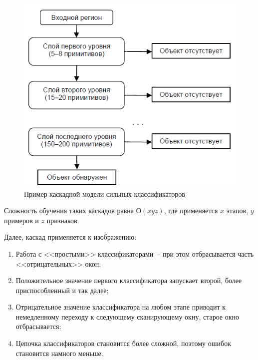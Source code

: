 \begin{figure}
    \centering
    \includegraphics[height=.3\textheight]{145644c4.png}
    \caption{Пример каскадной модели сильных классификаторов}
    \label{fig:adaboost}
\end{figure}

Сложность обучения таких каскадов равна $О(xyz)$, где применяется $x$ этапов, $y$ примеров и $z$ признаков.

Далее, каскад применяется к изображению:
\begin{enumerate}
    \item Работа с <<простыми>> классификаторами~-- при этом отбрасывается часть <<отрицательных>> окон;
    \item Положительное значение первого классификатора запускает второй, более приспособленный и так далее;
    \item Отрицательное значение классификатора на любом этапе приводит к немедленному переходу к следующему сканирующему окну,
        старое окно отбрасывается;
    \item Цепочка классификаторов становится более сложной, поэтому ошибок становится намного меньше.
\end{enumerate}

